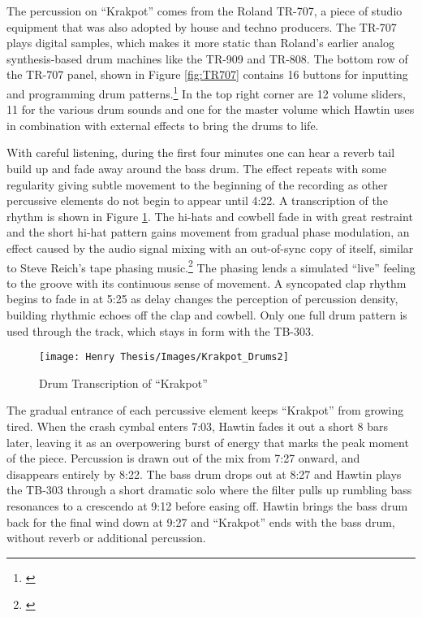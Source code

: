\documentclass[12pt,twoside]{reedthesis}
\begin{document}
The percussion on ``Krakpot'' comes from the Roland TR-707, a piece of studio equipment that was also adopted by house and techno producers. The TR-707 plays digital samples, which makes it more static than Roland's earlier analog synthesis-based drum machines like the TR-909 and TR-808. The bottom row of the TR-707 panel, shown in Figure \ref{fig:TR707} contains 16 buttons for inputting and programming drum patterns.\footnote{\cite{speculosDrumMachineRoland2008}} In the top right corner are 12 volume sliders, 11 for the various drum sounds and one for the master volume which Hawtin uses in combination with external effects to bring the drums to life.

With careful listening, during the first four minutes one can hear a reverb tail build up and fade away around the bass drum. The effect repeats with some regularity giving subtle movement to the beginning of the recording as other percussive elements do not begin to appear until 4:22. A transcription of the rhythm is shown in Figure \ref{fig:krakpot_drums}. The hi-hats and cowbell fade in with great restraint and the short hi-hat pattern gains movement from gradual phase modulation, an effect caused by the audio signal mixing with an out-of-sync copy of itself, similar to Steve Reich's tape phasing music.\footnote{\cite{huizengaFiftyYearsSteve2015}} The phasing lends a simulated ``live'' feeling to the groove with its continuous sense of movement. A syncopated clap rhythm begins to fade in at 5:25 as delay changes the perception of percussion density, building rhythmic echoes off the clap and cowbell. Only one full drum pattern is used through the track, which stays in form with the TB-303. 

\begin{figure}[htbp]
\begin{centering} 
\texttt{[image: Henry Thesis/Images/Krakpot\_Drums2]}
\caption{Drum Transcription of ``Krakpot''}
\label{fig:krakpot_drums}
\end{centering} 
\end{figure}

The gradual entrance of each percussive element keeps ``Krakpot'' from growing tired. When the crash cymbal enters 7:03, Hawtin fades it out a short 8 bars later, leaving it as an overpowering burst of energy that marks the peak moment of the piece. Percussion is drawn out of the mix from 7:27 onward, and disappears entirely by 8:22. The bass drum drops out at 8:27 and Hawtin plays the TB-303 through a short dramatic solo where the filter pulls up rumbling bass resonances to a crescendo at 9:12 before easing off. Hawtin brings the bass drum back for the final wind down at 9:27 and ``Krakpot'' ends with the bass drum, without reverb or additional percussion.
\end{document}
